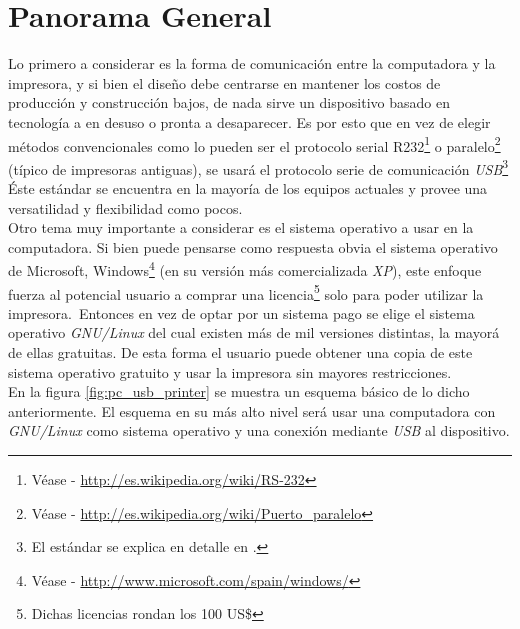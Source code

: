 \chapter{Panorama General}%

Lo primero a considerar es la forma de comunicaci\'on entre la computadora y
la impresora, y si bien el dise\~no debe centrarse en mantener los costos de
producci\'on y construcci\'on bajos, de nada sirve un dispositivo basado en
tecnolog\'ia a en desuso o pronta a desaparecer. Es por esto que en vez de
elegir m\'etodos convencionales como lo pueden ser el protocolo serial
R232\footnote{V\'ease - \url{http://es.wikipedia.org/wiki/RS-232}} o
paralelo\footnote{V\'ease - \url{http://es.wikipedia.org/wiki/Puerto_paralelo}}
(t\'ipico de impresoras antiguas), se usar\'a el protocolo serie de
comunicaci\'on \emph{USB}\footnote{El est\'andar se explica en detalle en
.} \'Este est\'andar se encuentra en la mayor\'ia de los
equipos actuales y provee una versatilidad y flexibilidad como pocos.\\

Otro tema muy importante a considerar es el sistema operativo a usar en la
computadora. Si bien puede pensarse como respuesta obvia el sistema operativo
de Microsoft,
Windows\footnote{V\'ease - \url{http://www.microsoft.com/spain/windows/}} (en
su versi\'on m\'as comercializada \emph{XP}), este enfoque fuerza al potencial
usuario a comprar una licencia\footnote{Dichas licencias rondan los 100 US\$}
solo para poder utilizar la impresora.\
Entonces en vez de optar por un sistema pago se elige el sistema
operativo \emph{GNU/Linux}
del cual existen m\'as de mil versiones distintas, la mayor\'a de ellas
gratuitas.
De esta forma el usuario puede obtener una copia de este sistema operativo
gratuito y usar la impresora sin mayores restricciones.\\

En la figura \ref{fig:pc_usb_printer} se muestra un esquema b\'asico de lo
dicho anteriormente. El esquema en su m\'as alto nivel ser\'a usar una
computadora con \emph{GNU/Linux} como sistema operativo y una conexi\'on
mediante \emph{USB} al dispositivo.\\


